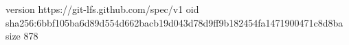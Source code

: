 version https://git-lfs.github.com/spec/v1
oid sha256:6bbf105ba6d89d554d662bacb19d043d78d9ff9b182454fa1471900471c8d8ba
size 878
